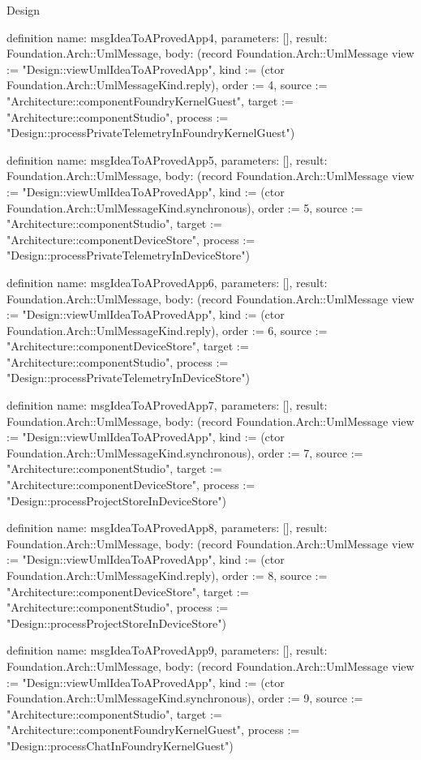 \begin{lexlean}{Design}
\begin{semanticmodule}
definition{
  name: msgIdeaToAProvedApp4,
  parameters: [],
  result: Foundation.Arch::UmlMessage,
  body: (record Foundation.Arch::UmlMessage {view := "Design::viewUmlIdeaToAProvedApp", kind := (ctor Foundation.Arch::UmlMessageKind.reply), order := 4, source := "Architecture::componentFoundryKernelGuest", target := "Architecture::componentStudio", process := "Design::processPrivateTelemetryInFoundryKernelGuest"})
}

definition{
  name: msgIdeaToAProvedApp5,
  parameters: [],
  result: Foundation.Arch::UmlMessage,
  body: (record Foundation.Arch::UmlMessage {view := "Design::viewUmlIdeaToAProvedApp", kind := (ctor Foundation.Arch::UmlMessageKind.synchronous), order := 5, source := "Architecture::componentStudio", target := "Architecture::componentDeviceStore", process := "Design::processPrivateTelemetryInDeviceStore"})
}

definition{
  name: msgIdeaToAProvedApp6,
  parameters: [],
  result: Foundation.Arch::UmlMessage,
  body: (record Foundation.Arch::UmlMessage {view := "Design::viewUmlIdeaToAProvedApp", kind := (ctor Foundation.Arch::UmlMessageKind.reply), order := 6, source := "Architecture::componentDeviceStore", target := "Architecture::componentStudio", process := "Design::processPrivateTelemetryInDeviceStore"})
}

definition{
  name: msgIdeaToAProvedApp7,
  parameters: [],
  result: Foundation.Arch::UmlMessage,
  body: (record Foundation.Arch::UmlMessage {view := "Design::viewUmlIdeaToAProvedApp", kind := (ctor Foundation.Arch::UmlMessageKind.synchronous), order := 7, source := "Architecture::componentStudio", target := "Architecture::componentDeviceStore", process := "Design::processProjectStoreInDeviceStore"})
}

definition{
  name: msgIdeaToAProvedApp8,
  parameters: [],
  result: Foundation.Arch::UmlMessage,
  body: (record Foundation.Arch::UmlMessage {view := "Design::viewUmlIdeaToAProvedApp", kind := (ctor Foundation.Arch::UmlMessageKind.reply), order := 8, source := "Architecture::componentDeviceStore", target := "Architecture::componentStudio", process := "Design::processProjectStoreInDeviceStore"})
}

definition{
  name: msgIdeaToAProvedApp9,
  parameters: [],
  result: Foundation.Arch::UmlMessage,
  body: (record Foundation.Arch::UmlMessage {view := "Design::viewUmlIdeaToAProvedApp", kind := (ctor Foundation.Arch::UmlMessageKind.synchronous), order := 9, source := "Architecture::componentStudio", target := "Architecture::componentFoundryKernelGuest", process := "Design::processChatInFoundryKernelGuest"})
}


\end{semanticmodule}
\end{lexlean}
